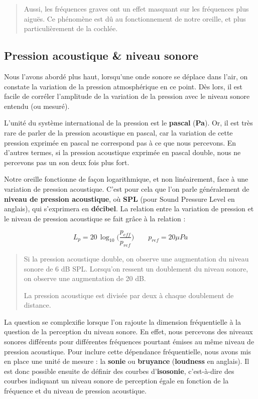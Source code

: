 \documentclass[
]{book}
\begin{document}
\begin{quote}
Aussi, les fréquences graves ont un effet masquant sur les fréquences plus aiguës. Ce phénomène est dû au fonctionnement de notre oreille, et plus particulièrement de la cochlée.
\end{quote}

\hypertarget{pression-acoustique-niveau-sonore}{%
\subsection{Pression acoustique \& niveau sonore}\label{pression-acoustique-niveau-sonore}}

Nous l'avons abordé plus haut, lorsqu'une onde sonore se déplace dans l'air, on constate la variation de la pression atmosphérique en ce point. Dès lors, il est facile de corréler l'amplitude de la variation de la pression avec le niveau sonore entendu (ou mesuré).

L'unité du système international de la pression est le \textbf{pascal} (\textbf{Pa}). Or, il est très rare de parler de la pression acoustique en pascal, car la variation de cette pression exprimée en pascal ne correspond pas à ce que nous percevons. En d'autres termes, si la pression acoustique exprimée en pascal double, nous ne percevons pas un son deux fois plus fort.

Notre oreille fonctionne de façon logarithmique, et non linéairement, face à une variation de pression acoustique. C'est pour cela que l'on parle généralement de \textbf{niveau de pression acoustique}, où \textbf{SPL} (pour Sound Pressure Level en anglais), qui s'exprimera en \textbf{décibel}. La relation entre la variation de pression et le niveau de pression acoustique se fait grâce à la relation :

\[L_p = 20\,\log_{10}\Big(\frac{p_{eff}}{p_{ref}}\Big) \qquad p_{ref} = 20\mu Pa\]

\begin{quote}
Si la pression acoustique double, on observe une augmentation du niveau sonore de 6 dB SPL. Lorsqu'on ressent un doublement du niveau sonore, on observe une augmentation de 20 dB.

La pression acoustique est divisée par deux à chaque doublement de distance.
\end{quote}

La question se complexifie lorsque l'on rajoute la dimension fréquentielle à la question de la perception du niveau sonore. En effet, nous percevons des niveaux sonores différents pour différentes fréquences pourtant émises au même niveau de pression acoustique. Pour inclure cette dépendance fréquentielle, nous avons mis en place une unité de mesure : la \textbf{sonie} ou \textbf{bruyance} (\textbf{loudness} en anglais). Il est donc possible ensuite de définir des courbes d'\textbf{isosonie}, c'est-à-dire des courbes indiquant un niveau sonore de perception égale en fonction de la fréquence et du niveau de pression acoustique.
\end{document}
